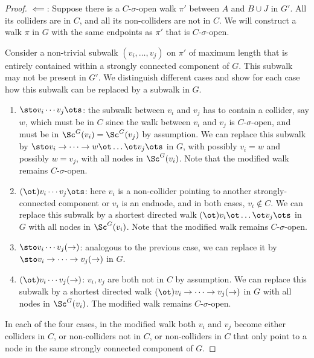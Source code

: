 \begin{proof}
$\impliedby$: Suppose there is a $C$-$\sigma$-open walk $\pi'$ between $A$ and $B \cup J$ in $G'$.
All its colliders are in $C$, and all its non-colliders are not in $C$. 
We will construct a walk $\pi$ in $G$ with the same endpoints as $\pi'$ that is $C$-$\sigma$-open.

Consider a non-trivial subwalk $(v_i,\dots,v_j)$ on $\pi'$ of maximum length that is entirely contained within a strongly connected component of $G$. 
This subwalk may not be present in $G'$.
We distinguish different cases and show for each case how this subwalk can be replaced by a subwalk in $G$.
\begin{enumerate}[label=(\roman*)]
  \item 
$\sto v_i \cdots v_j \ots$: the subwalk between $v_i$ and $v_j$ has to contain a collider, say $w$,
which must be in $C$ since the walk between $v_i$ and $v_j$ is $C$-$\sigma$-open, and must be in
$\Sc^G(v_i) = \Sc^G(v_j)$ by assumption. We can replace this subwalk by
$\sto v_i \to \dots \to w \ot \dots \ot v_j \ots$ in $G$,
with possibly $v_i = w$ and possibly $w = v_j$, 
with all nodes in $\Sc^G(v_i)$. 
Note that the modified walk remains $C$-$\sigma$-open.

\item
$(\ot) v_i \cdots v_j \ots$:
here $v_i$ is a non-collider pointing to another strongly-connected component or $v_i$ is an endnode,
and in both cases, $v_i \notin C$. 
We can replace this subwalk by a shortest directed walk
$(\ot) v_i \ot \dots \ot v_j \ots$ in $G$ with all nodes in $\Sc^G(v_i)$.
Note that the modified walk remains $C$-$\sigma$-open.

\item
$\sto v_i \cdots v_j (\to)$: analogous to the previous case, we can replace it by $\sto v_i \to \dots \to v_j (\to)$ in $G$.

\item
$(\ot) v_i \cdots v_j (\to)$: 
$v_i,v_j$ are both not in $C$ by assumption. We can replace this subwalk by a shortest directed walk
$(\ot) v_i \to \dots \to v_j (\to)$ in $G$ with all nodes in $\Sc^G(v_i)$.
The modified walk remains $C$-$\sigma$-open.
\end{enumerate}
In each of the four cases, in the modified walk both $v_i$ and $v_j$ become
either colliders in $C$, or non-colliders not in $C$, or non-colliders in $C$
that only point to a node in the same strongly connected component of $G$.


\end{proof}
